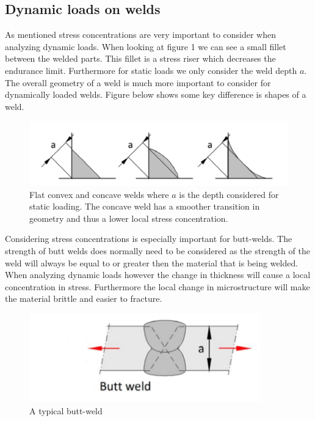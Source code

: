 \documentclass[11pt, a4paper]{article}
\begin{document}
\subsection{Dynamic loads on welds}
As mentioned stress concentrations are very important to consider when analyzing dynamic loads. When looking at figure 1 we can see a small fillet between the welded parts. This fillet is a stress riser which decreases the endurance limit. Furthermore for static loads we only consider the weld depth $a$. The overall geometry of a weld is much more important to consider for dynamically loaded welds. Figure below shows some key difference is shapes of a weld.

\begin{figure}[H]
  \centerline{\includegraphics[width=120mm]{images/Weld_types.png}}
  \caption{Flat convex and concave welds where $a$ is the depth considered for static loading. The concave weld has a smoother transition in geometry and thus a lower local stress concentration.}
\end{figure}

Considering stress concentrations is especially important for butt-welds. The strength of butt welds does normally need to be considered as the strength of the weld will always be equal to or greater then the material that is being welded. When analyzing dynamic loads however the change in thickness will cause a local concentration in stress. Furthermore the local change in microstructure will make the material brittle and easier to fracture.

\begin{figure}[H]
  \centerline{\includegraphics[width=100mm]{images/Butt_weld.png}}
  \caption{A typical butt-weld}
\end{figure}
\end{document}

